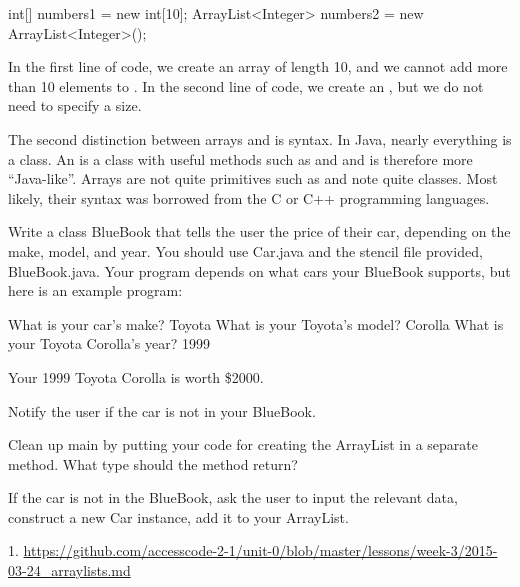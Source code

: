 \begin{code}
int[] numbers1 = new int[10];
ArrayList<Integer> numbers2 = new ArrayList<Integer>();
\end{code}

In the first line of code, we create an array of length 10, and we cannot add more than 10 elements to . In the second line of code, we create an , but we do not need to specify a size.

The second distinction between arrays and  is syntax. In Java, nearly everything is a class. An  is a class with useful methods such as  and  and is therefore more ``Java-like''. Arrays are not quite primitives such as  and note quite classes. Most likely, their syntax was borrowed from the C or C++ programming languages.

\exercisesection

\begin{exercise} Write a class BlueBook that tells the user the price of their car, depending on the make, model, and year. You should use Car.java and the stencil file provided, BlueBook.java. Your program depends on what cars your BlueBook supports, but here is an example program:

\begin{monospace}
What is your car's make?
Toyota
What is your Toyota's model?
Corolla
What is your Toyota Corolla's year?
1999

Your 1999 Toyota Corolla is worth \$2000.
\end{monospace}

\end{exercise}

\begin{exercise}
Notify the user if the car is not in your BlueBook.
\end{exercise}

\begin{exercise}
Clean up main by putting your code for creating the ArrayList in a separate method. What type should the method return?
\end{exercise}

\begin{exercise}
If the car is not in the BlueBook, ask the user to input the relevant data, construct a new Car instance, add it to your ArrayList.
\end{exercise}


1. \url{https://github.com/accesscode-2-1/unit-0/blob/master/lessons/week-3/2015-03-24_arraylists.md}